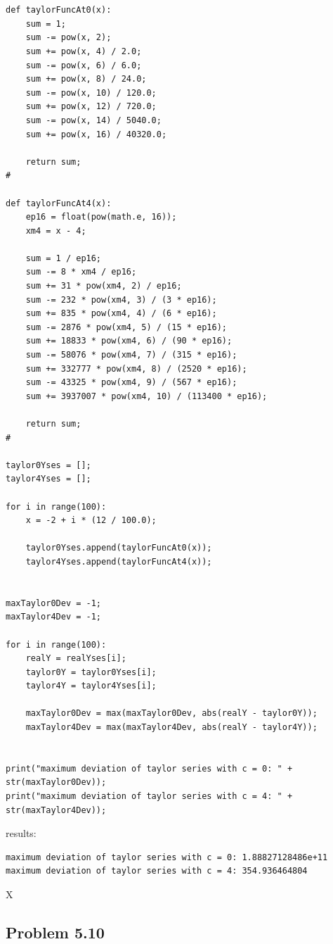 \begin{lstlisting}[caption=todo]


def taylorFuncAt0(x):
	sum = 1;
	sum -= pow(x, 2);
	sum += pow(x, 4) / 2.0;
	sum -= pow(x, 6) / 6.0;
	sum += pow(x, 8) / 24.0;
	sum -= pow(x, 10) / 120.0;
	sum += pow(x, 12) / 720.0;
	sum -= pow(x, 14) / 5040.0;
	sum += pow(x, 16) / 40320.0;
	
	return sum;
#

def taylorFuncAt4(x):
	ep16 = float(pow(math.e, 16));
	xm4 = x - 4;
	
	sum = 1 / ep16;
	sum -= 8 * xm4 / ep16;
	sum += 31 * pow(xm4, 2) / ep16;
	sum -= 232 * pow(xm4, 3) / (3 * ep16);
	sum += 835 * pow(xm4, 4) / (6 * ep16);
	sum -= 2876 * pow(xm4, 5) / (15 * ep16);
	sum += 18833 * pow(xm4, 6) / (90 * ep16);
	sum -= 58076 * pow(xm4, 7) / (315 * ep16);
	sum += 332777 * pow(xm4, 8) / (2520 * ep16);
	sum -= 43325 * pow(xm4, 9) / (567 * ep16);
	sum += 3937007 * pow(xm4, 10) / (113400 * ep16);
	
	return sum;
#

taylor0Yses = [];
taylor4Yses = [];

for i in range(100):
	x = -2 + i * (12 / 100.0);
	
	taylor0Yses.append(taylorFuncAt0(x));
	taylor4Yses.append(taylorFuncAt4(x));


maxTaylor0Dev = -1;
maxTaylor4Dev = -1;

for i in range(100):
	realY = realYses[i];
	taylor0Y = taylor0Yses[i];
	taylor4Y = taylor4Yses[i];
	
	maxTaylor0Dev = max(maxTaylor0Dev, abs(realY - taylor0Y));
	maxTaylor4Dev = max(maxTaylor4Dev, abs(realY - taylor4Y));


print("maximum deviation of taylor series with c = 0: " + str(maxTaylor0Dev));
print("maximum deviation of taylor series with c = 4: " + str(maxTaylor4Dev));
\end{lstlisting}


results:

\begin{lstlisting}[caption=Result of 1.1 a), keywordstyle=\color{black}]
maximum deviation of taylor series with c = 0: 1.88827128486e+11
maximum deviation of taylor series with c = 4: 354.936464804
\end{lstlisting}

X








\subsection{Problem 5.10}


